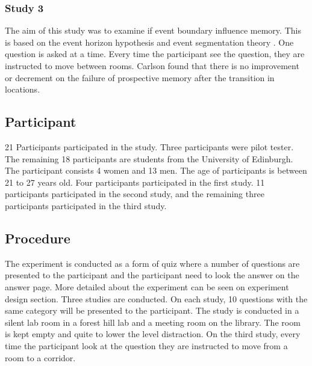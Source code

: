 \subsubsection{Study 3}
The aim of this study was to examine if event boundary influence memory. This is based on the event horizon hypothesis \citep{Radvansky2010} and
event segmentation theory \citep{Kurby2008}. One question is asked at a time.
Every time the participant see the question, they are instructed to move between rooms.
Carlson found that there is no improvement or decrement on the failure of prospective memory after the transition in locations.

%

\subsection{Participant}
21 Participants participated in the study. Three participants were pilot tester.
The remaining 18 participants are students from the University of Edinburgh.
The participant consists 4 women and 13 men. The age of participants is between 21 to 27 years old.
Four participants participated in the first study. 11 participants participated in the second study,
and the remaining three participants participated in the third study.


\subsection{Procedure}
The experiment is conducted as a form of quiz where a number of questions are presented to the participant and the participant need to look the answer on the answer page.
More detailed about the experiment can be seen on experiment design section.
Three studies are conducted. On each study, 10 questions with the same category will be presented to the participant. The study is conducted in a silent lab
 room in a forest hill lab and a meeting room on the library. The room is kept empty and quite to lower the level distraction.
On the third study, every time the participant look at the question they are instructed to move from a room to a corridor.

